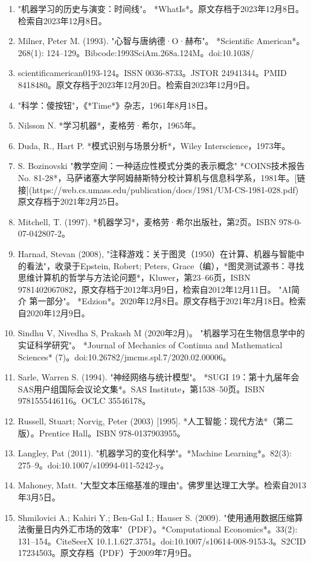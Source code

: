 \begin{enumerate}
\item "机器学习的历史与演变：时间线"。 *WhatIs*。原文存档于2023年12月8日。检索自2023年12月8日。  
\item Milner, Peter M. (1993). "心智与唐纳德·O·赫布"。 *Scientific American*。268(1): 124–129。Bibcode:1993SciAm.268a.124M。doi:10.1038/\item scientificamerican0193-124。ISSN 0036-8733。JSTOR 24941344。PMID 8418480。原文存档于2023年12月20日。检索自2023年12月9日。  
\item "科学：傻按钮"，《*Time*》杂志，1961年8月18日。  
\item Nilsson N. *学习机器*，麦格劳·希尔，1965年。  
\item Duda, R., Hart P. *模式识别与场景分析*，Wiley Interscience，1973年。  
\item S. Bozinovski "教学空间：一种适应性模式分类的表示概念" *COINS技术报告 No. 81-28*，马萨诸塞大学阿姆赫斯特分校计算机与信息科学系，1981年。[链接](https://web.cs.umass.edu/publication/docs/1981/UM-CS-1981-028.pdf) 原文存档于2021年2月25日。  
\item Mitchell, T. (1997). *机器学习*，麦格劳·希尔出版社，第2页。ISBN 978-0-07-042807-2。  
\item Harnad, Stevan (2008), "注释游戏：关于图灵（1950）在计算、机器与智能中的看法"，收录于Epstein, Robert; Peters, Grace（编），*图灵测试源书：寻找思维计算机的哲学与方法论问题*，Kluwer，第23–66页，ISBN 9781402067082，原文存档于2012年3月9日，检索自2012年12月11日。  
"AI简介 第一部分"。 *Edzion*。2020年12月8日。原文存档于2021年2月18日。检索自2020年12月9日。  
\item Sindhu V, Nivedha S, Prakash M (2020年2月)。 "机器学习在生物信息学中的实证科学研究"。 *Journal of Mechanics of Continua and Mathematical Sciences* (7)。doi:10.26782/jmcms.spl.7/2020.02.00006。  
\item Sarle, Warren S. (1994). "神经网络与统计模型"。 *SUGI 19：第十九届年会SAS用户组国际会议论文集*。SAS Institute，第1538–50页。ISBN 9781555446116。OCLC 35546178。
\item Russell, Stuart; Norvig, Peter (2003) [1995]. *人工智能：现代方法*（第二版）。Prentice Hall。ISBN 978-0137903955。  
\item Langley, Pat (2011). "机器学习的变化科学"。*Machine Learning*。82(3): 275–9。doi:10.1007/s10994-011-5242-y。  
\item Mahoney, Matt. "大型文本压缩基准的理由"。佛罗里达理工大学。检索自2013年3月5日。  
\item Shmilovici A.; Kahiri Y.; Ben-Gal I.; Hauser S. (2009). "使用通用数据压缩算法衡量日内外汇市场的效率"（PDF）。*Computational Economics*。33(2): 131–154。CiteSeerX 10.1.1.627.3751。doi:10.1007/s10614-008-9153-3。S2CID 17234503。原文存档（PDF）于2009年7月9日。  

\end{enumerate}
